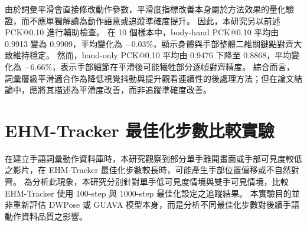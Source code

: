 \documentclass[class=NCU_thesis, crop=false]{standalone}
\begin{document}
\begin{table}[H]
\centering
\caption{各詞彙樣本之平滑度改善比例}
\label{tab:word_smoothing_sample_results}
\small
{}
\end{table}

由於詞彙平滑會直接修改動作參數，平滑度指標改善本身屬於方法效果的量化驗證，而不應單獨解讀為動作語意或追蹤準確度提升。
因此，本研究另以前述 PCK@0.10 進行輔助檢查。
在 10 個樣本中，body-hand PCK@0.10 平均由 0.9913 變為 0.9909，平均變化為 $-0.03\%$，顯示身體與手部整體二維關鍵點對齊大致維持穩定。
然而，hand-only PCK@0.10 平均由 0.9476 下降至 0.8868，平均變化為 $-6.66\%$，表示手部細節在平滑後可能犧牲部分逐幀對齊精度。
綜合而言，詞彙層級平滑適合作為降低視覺抖動與提升觀看連續性的後處理方法；但在論文結論中，應將其描述為平滑度改善，而非追蹤準確度改善。

\section{EHM-Tracker 最佳化步數比較實驗}
\label{sec:exp_tracking_steps}

在建立手語詞彙動作資料庫時，本研究觀察到部分單手離開畫面或手部可見度較低之影片，在 EHM-Tracker 最佳化步數較長時，可能產生手部位置偏移或不自然對齊。
為分析此現象，本研究分別針對單手低可見度情境與雙手可見情境，比較 EHM-Tracker 使用 100-step 與 1000-step 最佳化設定之追蹤結果。
本實驗目的並非重新評估 DWPose 或 GUAVA 模型本身，而是分析不同最佳化步數對後續手語動作資料品質之影響。
\end{document}
